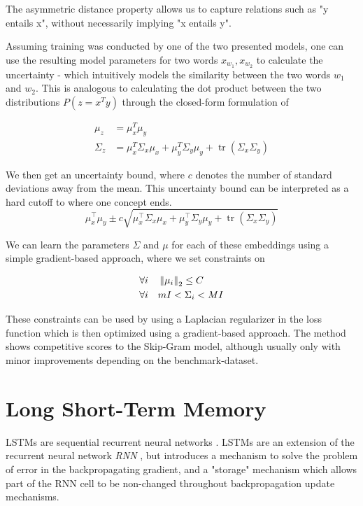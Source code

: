 \documentclass[a4paper,12pt,oneside,openright]{report}
\begin{document}
The asymmetric distance property allows us to capture relations such as "y entails x", without necessarily implying "x entails y".

Assuming training was conducted by one of the two presented models, one can use the resulting model parameters for two words $x_{w_1}, x_{w_2}$ to calculate the uncertainty - which intuitively models the similarity between the two words $w_1$ and $w_2$.
This is analogous to calculating the dot product between the two distributions $P(z=x^T y)$ through the closed-form formulation of

\begin{align}
\mu_z &= \mu_x^T \mu_y \\
\Sigma_z &= \mu_{x}^T \Sigma_{x} \mu_{x}+\mu_{y}^T \Sigma_{y} \mu_{y}+\operatorname{tr}\left(\Sigma_{x} \Sigma_{y}\right)
\end{align}

We then get an uncertainty bound, where $c$ denotes the number of standard deviations away from the mean.
This uncertainty bound can be interpreted as a hard cutoff to where one concept ends.
\begin{equation}
\mu_{x}^{\top} \mu_{y} \pm c \sqrt{\mu_{x}^{\top} \Sigma_{x} \mu_{x}+\mu_{y}^{\top} \Sigma_{y} \mu_{y}+\operatorname{tr}\left(\Sigma_{x} \Sigma_{y}\right)}
\end{equation}

We can learn the parameters $\Sigma$ and $\mu$ for each of these embeddings using a simple gradient-based approach, where we set constraints on 

\begin{align}
\forall i \quad & \left\lVert \mu_i \right\rVert_2  \leq C\\
\forall i \quad & m I <  \Sigma_i < M I
\end{align}

These constraints can be used by using a Laplacian regularizer in the loss function which is then optimized using a gradient-based approach. 
The method shows competitive scores to the Skip-Gram model, although usually only with minor improvements depending on the benchmark-dataset.

\section{Long Short-Term Memory}\label{appendix:LSTM}

LSTMs are sequential recurrent neural networks \cite{hochreiter97}.
LSTMs are an extension of the recurrent neural network \textit{RNN} \cite{rumelhart85}, but introduces a mechanism to solve the problem of error in the backpropagating gradient, and a "storage" mechanism which allows part of the RNN cell to be non-changed throughout backpropagation update mechanisms.
\end{document}
